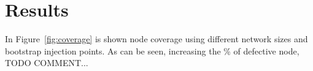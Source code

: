 
\section{Results}
\label{sec:results}


In Figure~\ref{fig:coverage} is shown node coverage using different
network sizes and bootstrap injection points. As can be seen,
increasing the \% of defective node, TODO COMMENT... 

